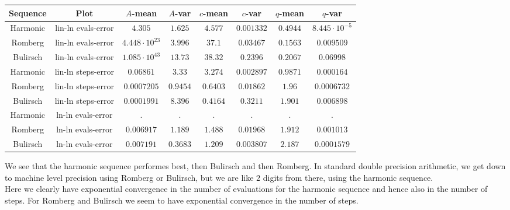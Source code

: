 \begin{table}[H]
    \centering
    \small
    \begin{tabular}{c|c||c|c|c|c|c	|c}
Sequence & Plot & \(A\)-mean & \(A\)-var & \(c\)-mean & \(c\)-var & \(q\)-mean & \(q\)-var\\\hline
Harmonic & lin-ln evals-error & \(4.305\) & \(1.625\) & \(4.577\) & \(0.001332\) & \(0.4944\) & \(8.445\cdot 10^{-5}\) \\
Romberg & lin-ln evals-error & \(4.448\cdot 10^{23}\) & \(3.996\) & \(37.1\) & \(0.03467\) & \(0.1563\) & \(0.009509\) \\
Bulirsch & lin-ln evals-error & \(1.085\cdot 10^{43}\) & \(13.73\) & \(38.32\) & \(0.2396\) & \(0.2067\) & \(0.06998\) \\
Harmonic & lin-ln steps-error & \(0.06861\) & \(3.33\) & \(3.274\) & \(0.002897\) & \(0.9871\) & \(0.000164\) \\
Romberg & lin-ln steps-error & \(0.0007205\) & \(0.9454\) & \(0.6403\) & \(0.01862\) & \(1.96\) & \(0.0006732\) \\
Bulirsch & lin-ln steps-error & \(0.0001991\) & \(8.396\) & \(0.4164\) & \(0.3211\) & \(1.901\) & \(0.006898\) \\
Harmonic & ln-ln evals-error & . & . & . & . & . & . \\
Romberg & ln-ln evals-error & \(0.006917\) & \(1.189\) & \(1.488\) & \(0.01968\) & \(1.912\) & \(0.001013\) \\
Bulirsch & ln-ln evals-error & \(0.007191\) & \(0.3683\) & \(1.209\) & \(0.003807\) & \(2.187\) & \(0.0001579\) \\
    \end{tabular}
    \label{tab:my_label}
\end{table}

We see that the harmonic sequence performes best, then Bulirsch and then Romberg. In standard double precision arithmetic, we get down to machine level precision using Romberg or Bulirsch, but we are like \(2\) digits from there, using the harmonic sequence.\\

Here we clearly have exponential convergence in the number of evaluations for the harmonic sequence and hence also in the number of steps. For Romberg and Bulirsch we seem to have exponential convergence in the number of steps.\\ 

